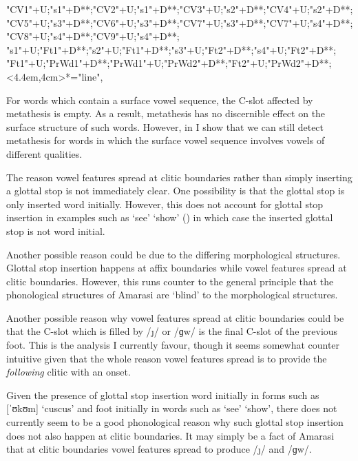 \begin{multicols}{2}
\begin{exe}
{\begin{xlist}
{		"CV1"+U;"s1"+D**\dir{-};"CV2"+U;"s1"+D**\dir{-};"CV3"+U;"s2"+D**\dir{-};"CV4"+U;"s2"+D**\dir{-};
		"CV5"+U;"s3"+D**\dir{-};"CV6"+U;"s3"+D**\dir{-};"CV7"+U;"s3"+D**\dir{-};"CV7"+U;"s4"+D**\dir{-};"CV8"+U;"s4"+D**\dir{-};"CV9"+U;"s4"+D**\dir{-};
		"s1"+U;"Ft1"+D**\dir{-};"s2"+U;"Ft1"+D**\dir{-};"s3"+U;"Ft2"+D**\dir{-};"s4"+U;"Ft2"+D**\dir{-};
		"Ft1"+U;"PrWd1"+D**\dir{-};"PrWd1"+U;"PrWd2"+D**\dir{-};"Ft2"+U;"PrWd2"+D**\dir{-};
		<4.4em,4cm>*="line",
	\endxy}\label{as:niij=ee,kfuugw=ee2}
	\end{xlist}}
\end{exe}
\end{multicols}

For words which contain a surface vowel sequence,
the C-slot affected by metathesis is empty.
As a result, metathesis has no discernible effect on the surface structure of such words.
However, in  I show that we can still detect metathesis
for words in which the surface vowel sequence involves vowels of different qualities.

The reason vowel features spread at clitic
boundaries rather than simply inserting a glottal stop is not immediately clear.
One possibility is that the glottal stop is only inserted word initially.
However, this does not account for glottal stop insertion in examples
such as  `see' {\ra}  `show' ()
in which case the inserted glottal stop is not word initial.
\label{WhyNotGlottal?}

Another possible reason could be due to the differing morphological structures.
Glottal stop insertion happens at affix boundaries
while vowel features spread at clitic boundaries.
However, this runs counter to the general principle
that the phonological structures of Amarasi are `blind'
to the morphological structures.

Another possible reason why vowel features spread at clitic
boundaries could be that the C-slot which is filled by /\j/ or /ɡw/
is the final C-slot of the previous foot.
This is the analysis I currently favour,
though it seems somewhat counter intuitive
given that the whole reason vowel features spread is to
provide the \emph{following} clitic with an onset.

Given the presence of glottal stop insertion
word initially in forms such as  {\ra} [ˈʊkʊm] `cuscus'
and foot initially in words such as  `see' {\ra}  `show',
there does not currently seem to be a good phonological
reason why such glottal stop insertion does not also happen at clitic boundaries.
It may simply be a fact of Amarasi that at clitic
boundaries vowel features spread to produce /\j/ and /ɡw/.

